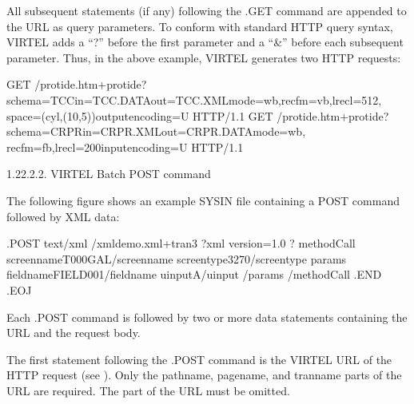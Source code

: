 \documentclass[letterpaper,10pt,english]{sphinxmanual}
\begin{document}
All subsequent statements (if any) following the .GET command are appended to the URL as query parameters. To
conform with standard HTTP query syntax, VIRTEL adds a “?” before the first parameter and a “\&” before each
subsequent parameter. Thus, in the above example, VIRTEL generates two HTTP requests:

\begin{sphinxVerbatim}[commandchars=\\\{\}]
GET /protide.htm+protide?
schema=TCC\PYGZam{}in=\PYGZsq{}TCC.DATA\PYGZsq{}\PYGZam{}out=\PYGZsq{}TCC.XML\PYGZsq{}\PYGZam{}mode=wb,recfm=vb,lrecl=512,
space=(cyl,(10,5))\PYGZam{}output\PYGZus{}encoding=U HTTP/1.1
GET /protide.htm+protide?schema=CRPR\PYGZam{}in=\PYGZsq{}CRPR.XML\PYGZsq{}\PYGZam{}out=\PYGZsq{}CRPR.DATA\PYGZsq{}\PYGZam{}mode=wb,
recfm=fb,lrecl=200\PYGZam{}input\PYGZus{}encoding=U HTTP/1.1
\end{sphinxVerbatim}


1.22.2.2. VIRTEL Batch POST command

The following figure shows an example SYSIN file containing a POST command followed by XML data:

\begin{sphinxVerbatim}[commandchars=\\\{\}]
.POST text/xml
/xmldemo.xml+tran3
\PYGZlt{}?xml version=\PYGZdq{}1.0\PYGZdq{} ?\PYGZgt{}
\PYGZlt{}methodCall\PYGZgt{}
    \PYGZlt{}screenname\PYGZgt{}T000\PYGZhy{}GAL\PYGZlt{}/screenname\PYGZgt{}
    \PYGZlt{}screentype\PYGZgt{}3270\PYGZlt{}/screentype\PYGZgt{}
    \PYGZlt{}params\PYGZgt{}
        \PYGZlt{}fieldname\PYGZgt{}FIELD001\PYGZlt{}/fieldname\PYGZgt{}
        \PYGZlt{}uinput\PYGZgt{}A\PYGZlt{}/uinput\PYGZgt{}
    \PYGZlt{}/params\PYGZgt{}
\PYGZlt{}/methodCall\PYGZgt{}
.END
.EOJ
\end{sphinxVerbatim}


Each .POST command is followed by two or more data statements containing the URL and the request body.

The first statement following the .POST command is the VIRTEL URL of the HTTP request (see {\hyperref[\detokenize{User_Guide:v457ug-url-formats}]{}}). Only the pathname, pagename, and tranname parts of the URL are required. The  part of the URL must be omitted.
\end{document}
